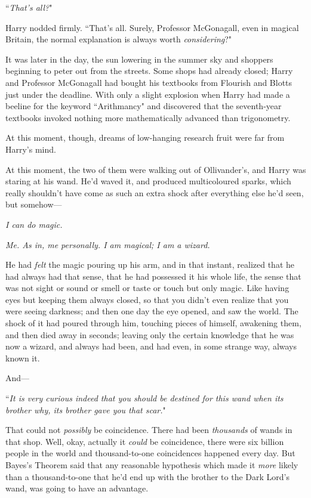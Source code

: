 ``\emph{That's all?}"

Harry nodded firmly. ``That's all. Surely, Professor McGonagall, even in magical Britain, the normal explanation is always worth \emph{considering}?"

\later

It was later in the day, the sun lowering in the summer sky and shoppers beginning to peter out from the streets. Some shops had already closed; Harry and Professor McGonagall had bought his textbooks from Flourish and Blotts just under the deadline. With only a slight explosion when Harry had made a beeline for the keyword ``Arithmancy" and discovered that the seventh-year textbooks invoked nothing more mathematically advanced than trigonometry.

At this moment, though, dreams of low-hanging research fruit were far from Harry's mind.

At this moment, the two of them were walking out of Ollivander's, and Harry was staring at his wand. He'd waved it, and produced multicoloured sparks, which really shouldn't have come as such an extra shock after everything else he'd seen, but somehow—

\emph{I can do magic.}

\emph{Me. As in, me personally. I am magical; I am a wizard.}

He had \emph{felt} the magic pouring up his arm, and in that instant, realized that he had always had that sense, that he had possessed it his whole life, the sense that was not sight or sound or smell or taste or touch but only magic. Like having eyes but keeping them always closed, so that you didn't even realize that you were seeing darkness; and then one day the eye opened, and saw the world. The shock of it had poured through him, touching pieces of himself, awakening them, and then died away in seconds; leaving only the certain knowledge that he was now a wizard, and always had been, and had even, in some strange way, always known it.

And—

``\emph{It is very curious indeed that you should be destined for this wand when its brother why, its brother gave you that scar.}"

That could not \emph{possibly} be coincidence. There had been \emph{thousands} of wands in that shop. Well, okay, actually it \emph{could} be coincidence, there were six billion people in the world and thousand-to-one coincidences happened every day. But Bayes's Theorem said that any reasonable hypothesis which made it \emph{more} likely than a thousand-to-one that he'd end up with the brother to the Dark Lord's wand, was going to have an advantage.

